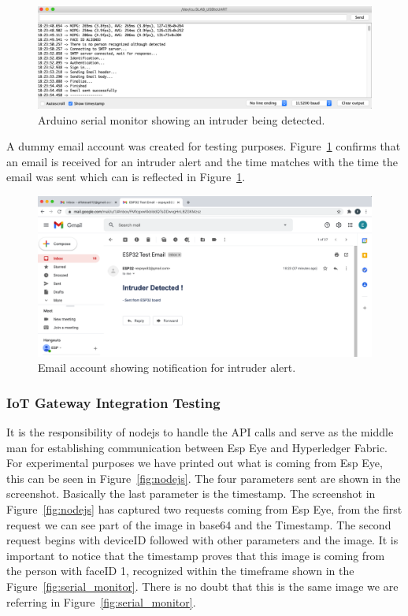\begin{figure}[!htb]
    \centering
    \includegraphics[width=1\textwidth]{figures/serialportemail.png}
    \caption{Arduino serial monitor showing an intruder being detected.}
    \label{fig:serial_email}
\end{figure}

 A dummy email account was created for testing purposes. Figure~\ref{fig:serial_email} confirms that an email is received for an intruder alert and the time matches with the time the email was sent which can is reflected in Figure~\ref{fig:serial_email}.
\begin{figure}[!htb]
    \centering
    \includegraphics[width=1\textwidth]{figures/email.png}
    \caption{Email account showing notification for intruder alert.}
    \label{fig:email_intruder}
\end{figure}


\subsubsection{IoT Gateway Integration Testing}

It is the responsibility of nodejs to handle the API calls and serve as the middle man for establishing communication between Esp Eye and Hyperledger Fabric. For experimental purposes we have printed out what is coming from Esp Eye, this can be seen in Figure~\ref{fig:nodejs}. The four parameters sent are shown in the screenshot. Basically the last parameter is the timestamp. The screenshot in Figure~\ref{fig:nodejs} has captured two requests coming from Esp Eye, from the first request we can see part of the image in base64 and the Timestamp. The second request begins with deviceID followed with other parameters and the image. It is important to notice that the timestamp proves that this image is coming from the person with faceID 1, recognized within the timeframe shown in the Figure~\ref{fig:serial_monitor}. There is no doubt that this is the same image we are referring in Figure~\ref{fig:serial_monitor}.

